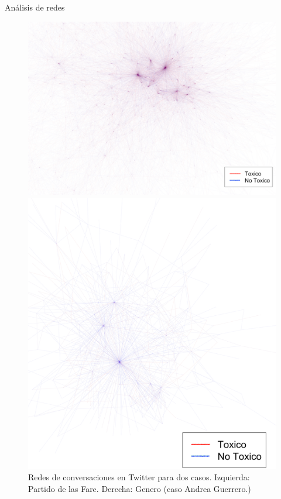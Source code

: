 \documentclass[11pt,usenames, dvipsnames]{beamer}
\begin{document}
\begin{frame}{Análisis de redes}
    \begin{figure}
        \centering
        \begin{minipage}{0.49\textwidth}
            \includegraphics[width=0.6\textheight]{figures/red_farc}
        \end{minipage}
        \begin{minipage}{0.49\textwidth}
            \includegraphics[width=0.5\textheight]{figures/red_genero}
        \end{minipage}    
        \caption{Redes de conversaciones en Twitter para dos casos. Izquierda: Partido de las Farc. Derecha: Genero (caso Andrea Guerrero.)}
    \end{figure}
\end{frame}
\end{document}
